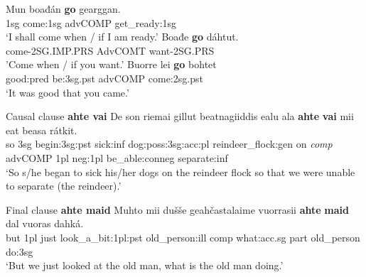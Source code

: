 \documentclass[a4,12pt]{scrartcl}
\begin{document}
\begin{exe}
\ex \label{goTemporal}
\begin{xlist}
\ex %
\citep[196]{nickel1994}
\gll 	Mun 	boađán 	{\bf go} 	gearggan.\\
	{\sc 1sg} come:{\sc 1sg} {\sc advCOMP} get\_ready:{\sc 1sg}\\
\glt 	‘I shall come when / if I am ready.’%
%
\ex \label{goContextDisambig} \cite[196–7]{nickel1994}
\gll Boađe {\bf go} dáhtut.\\ %
come-2SG.IMP.PRS AdvCOMT want-2SG.PRS\\
\glt 'Come when / if you want.'
%
\ex %
\citep[436]{nickel1994}%
\gll 	Buorre 	lei 	{\bf go} 	bohtet\\
	good:{\sc pred} be:{\sc 3sg.pst} {\sc advCOMP} come:{\sc 2sg.pst}\\
\glt 	‘It was good that you came.’
\end{xlist}
	
	

	\ex \label{ahteVai} Causal clause \textbf{ahte vai} \citep[196]{nickel1994}
	\gll 	De 	son 	riemai 	gillut 	beatnagiiddis 	ealu 	ala 	{\bf ahte} {\bf vai} 	mii 	eat 	beasa 	rátkit.\\
	so {\sc 3sg} begin:{\sc 3sg:pst} sick:{\sc inf} dog:{\sc poss:3sg:acc:pl} reindeer\_flock:{\sc gen} on {\it comp} {\sc advCOMP} {\sc 1pl} {\sc neg:1pl} be\_able:{\sc conneg} separate:{\sc inf}\\
	\glt ‘So s/he began to sick his/her dogs on the reindeer flock so that we were unable to separate (the reindeer).’

	\ex \label{ahteMaid} Final clause \textbf{ahte maid} \citep[196]{nickel1994}
	\gll 	Muhto 	mii 	dušše 	geahčastalaime 	vuorrasii 	{\bf ahte} {\bf maid} 	dal 	vuoras 	dahká.\\
	but {\sc 1pl} just look\_a\_bit:{\sc 1pl:pst} old\_person:{\sc ill} {\sc comp} what:{\sc acc.sg} {\sc part} old\_person do:{\sc 3sg}\\
	\glt 	‘But we just looked at the old man, what is the old man doing.'%

\end{exe}
\end{document}

